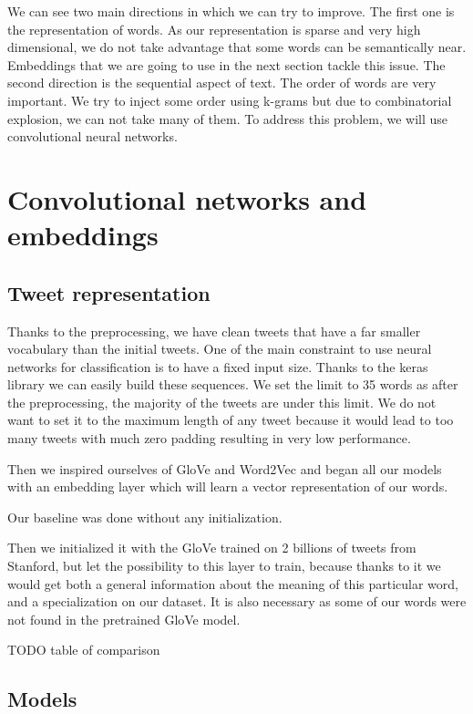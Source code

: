 \documentclass[10pt,conference,compsocconf]{IEEEtran}
\begin{document}
We can see two main directions in which we can try to improve. The first one is the representation of words. As our representation is sparse and very high dimensional, we do not take advantage that some words can be semantically near. Embeddings that we are going to use in the next section tackle this issue. The second direction is the sequential aspect of text. The order of words are very important. We try to inject some order using k-grams but due to combinatorial explosion, we can not take many of them. To address this problem, we will use convolutional neural networks.

\section{Convolutional networks and embeddings}

\subsection{Tweet representation}

Thanks to the preprocessing, we have clean tweets that have a far smaller vocabulary than the initial tweets. One of the main constraint to use neural networks for classification is to have a fixed input size. Thanks to the keras library we can easily build these sequences. We set the limit to 35 words as after the preprocessing, the majority of the tweets are under this limit. We do not want to set it to the maximum length of any tweet because it would lead to too many tweets with much zero padding resulting in very low performance.

Then we inspired ourselves of GloVe and Word2Vec and began all our models with an embedding layer which will learn a vector representation of our words.

Our baseline was done without any initialization.

Then we initialized it with the GloVe trained on 2 billions of tweets from Stanford, but let the possibility to this layer to train, because thanks to it we would get both a general information about the meaning of this particular word, and a specialization on our dataset. It is also necessary as some of our words were not found in the pretrained GloVe model.

TODO table of comparison

\subsection{Models}
\end{document}
